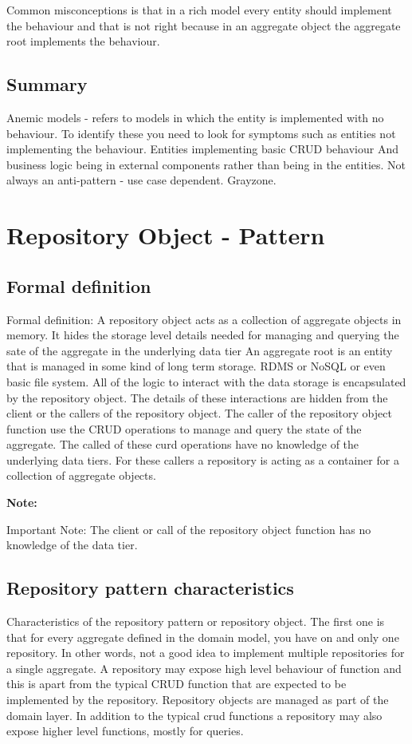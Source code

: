 \documentclass[a4paper, 11pt]{book}
\newenvironment{note}{
    \begin{siderule}
        \textbf{Note: }
        }{
    \end{siderule}
}
\begin{document}
    Common misconceptions is that in a rich model every entity should implement the behaviour and that is not right because in an aggregate object the aggregate root implements the behaviour.

    \subsection{Summary}
    Anemic models - refers to models in which the entity is implemented with no behaviour.
    To identify these you need to look for symptoms such as entities not implementing the behaviour.
    Entities implementing basic CRUD behaviour
    And business logic being in external components rather than being in the entities.
    Not always an anti-pattern - use case dependent. Grayzone.

    \section{Repository Object - Pattern}

    \subsection{Formal definition}
    Formal definition: A repository object acts as a collection of aggregate objects in memory.
    It hides the storage level details needed for managing and querying the sate of the aggregate in the underlying data tier
    An aggregate root is an entity that is managed in some kind of long term storage.
    RDMS or NoSQL or even basic file system.
    All of the logic to interact with the data storage is encapsulated by the repository object.
    The details of these interactions are hidden from the client or the callers of the repository object.
    The caller of the repository object function use the CRUD operations to manage and query the state of the aggregate.
    The called of these curd operations have no knowledge of the underlying data tiers.
    For these callers a repository is acting as a container for a collection of aggregate objects.

    \begin{note}
    Important Note: The client or call of the repository object function has no knowledge of the data tier.
    \end{note}

    \subsection{Repository pattern characteristics}
    Characteristics of the repository pattern or repository object.
    The first one is that for every aggregate defined in the domain model, you have on and only one repository.
    In other words, not a good idea to implement multiple repositories for a single aggregate.
    A repository may expose high level behaviour of function and this is apart from the typical CRUD function that are expected to be implemented by the repository.
    Repository objects are managed as part of the domain layer.
    In addition to the typical crud functions a repository may also expose higher level functions, mostly for queries.
\end{document}

